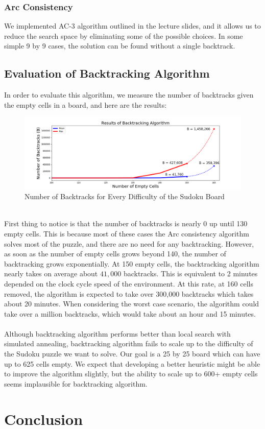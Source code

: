 \documentclass[12pt, a4paper]{article}
\begin{document}
			\subsubsection{Arc Consistency}
				We implemented AC-3 algorithm outlined in the lecture slides, and it allows us to reduce the search space by eliminating some of the possible choices. In some simple 9 by 9 cases, the solution can be found without a single backtrack.
		\subsection{Evaluation of Backtracking Algorithm}
			In order to evaluate this algorithm, we measure the number of backtracks given the empty cells in a board, and here are the results:
			\begin{figure}[h]
				\begin{center} 
					\includegraphics[width=7in]{backtrack.png}
					\caption{Number of Backtracks for Every Difficulty of the Sudoku Board} 
				\end{center} 
			\end{figure}\\
			First thing to notice is that the number of backtracks is nearly 0 up until 130 empty cells. This is because most of these cases the Arc consistency algorithm solves most of the puzzle, and there are no need for any backtracking. However, as soon as the number of empty cells grows beyond 140, the number of backtracking grows exponentially. At 150 empty cells, the backtracking algorithm nearly takes on average about $41,000$ backtracks. This is equivalent to 2 minutes depended on the clock cycle speed of the environment. At this rate, at 160 cells removed, the algorithm is expected to take over 300,000 backtracks which takes about 20 minutes. When considering the worst case scenario, the algorithm could take over a million backtracks, which would take about an hour and 15 minutes.\\\\
			Although backtracking algorithm performs better than local search with simulated annealing, backtracking algorithm fails to scale up to the difficulty of the Sudoku puzzle we want to solve. Our goal is a 25 by 25 board which can have up to 625 cells empty. We expect that developing a better heuristic might be able to improve the algorithm slightly, but the ability to scale up to 600+ empty cells seems implausible for backtracking algorithm.
	\section{Conclusion}
\end{document}

